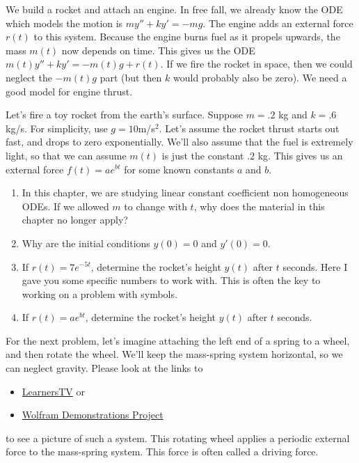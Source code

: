 

\begin{problem}
%
We build a rocket and attach an engine.  In free fall, we already know the ODE which models the motion is $my''+ky'=-mg$. The engine adds an external force $r(t)$ to this system. Because the engine burns fuel as it propels upwards, the mass $m(t)$ now depends on time. This gives us the ODE $m(t)y''+ky'=-m(t)g+r(t)$. If we fire the rocket in space, then we could neglect the $-m(t)g$ part (but then $k$ would probably also be zero). We need a good model for engine thrust. 

Let's fire a toy rocket from the earth's surface. Suppose $m=.2$ kg and $k=.6$ kg/s. For simplicity, use $g=10$m/s$^2$. Let's assume the rocket thrust starts out fast, and drops to zero exponentially. We'll also assume that the fuel is extremely light, so that we can assume $m(t)$ is just the constant $.2$ kg. This gives us an external force $f(t) = ae^{bt}$ for some known constants $a$ and $b$. 
\begin{enumerate}
 \item In this chapter, we are studying linear constant coefficient non homogeneous ODEs. If we allowed $m$ to change with $t$, why does the material in this chapter no longer apply?
\item Why are the initial conditions $y(0)=0$ and $y'(0)=0$.  
\item If $r(t) = 7 e^{-5t}$, determine the rocket's height $y(t)$ after $t$ seconds. Here I gave you some specific numbers to work with. This is often the key to working on a problem with symbols.  
 \item If $r(t) = a e^{bt}$, determine the rocket's height $y(t)$ after $t$ seconds. 
\end{enumerate}
\end{problem}

For the next problem, let's imagine attaching the left end of a spring to a wheel, and then rotate the wheel.  We'll keep the mass-spring system horizontal, so we can neglect gravity. Please look at the links to  
\begin{itemize}
\item 
 \href{http://www.learnerstv.com/animation/animation.php?ani=\%2049&cat=physics}{LearnersTV} or 
\item
 \href{https://www.google.com/url?sa=t&rct=j&q=&esrc=s&source=web&cd=4&cad=rja&sqi=2&ved=0CEkQtwIwAw&url=http\%3A\%2F\%2Fdemonstrations.wolfram.com\%2FDrivenDampedOscillator\%2F&ei=CwcuUdnmCIe9iwKUmYHQDw&usg=AFQjCNHgemDM_x_B8xl3DvNW0A--vPm2gA}{Wolfram Demonstrations Project} 
\end{itemize}
to see a picture of such a system.  This rotating wheel applies a periodic  external force to the mass-spring system.  This force is often called a driving force.

